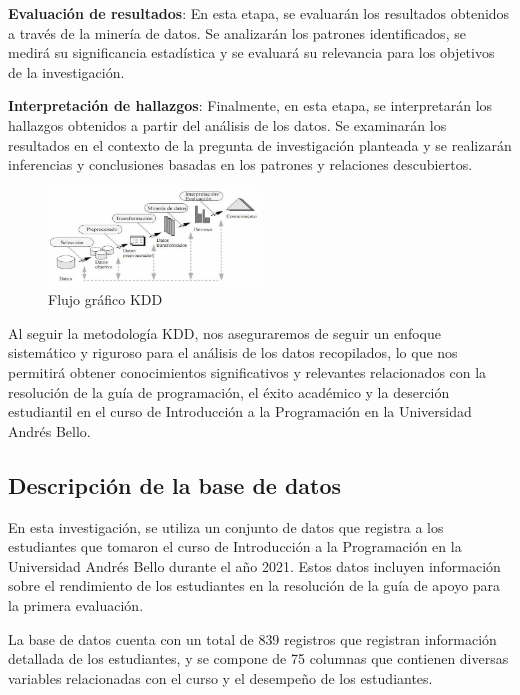 \textbf{Evaluación de resultados}: En esta etapa, se evaluarán los resultados obtenidos a través de la minería de datos. Se analizarán los patrones identificados, se medirá su significancia estadística y se evaluará su relevancia para los objetivos de la investigación.

\textbf{Interpretación de hallazgos}: Finalmente, en esta etapa, se interpretarán los hallazgos obtenidos a partir del análisis de los datos. Se examinarán los resultados en el contexto de la pregunta de investigación planteada y se realizarán inferencias y conclusiones basadas en los patrones y relaciones descubiertos.

\begin{figure}[H]
  \centering
  \includegraphics[width=0.5\textwidth]{img/KDD.png}
  \caption{Flujo gráfico KDD}
  \label{fig:flujo_kdd}
\end{figure}

Al seguir la metodología KDD, nos aseguraremos de seguir un enfoque sistemático y riguroso para el análisis de los datos recopilados, lo que nos permitirá obtener conocimientos significativos y relevantes relacionados con la resolución de la guía de programación, el éxito académico y la deserción estudiantil en el curso de Introducción a la Programación en la Universidad Andrés Bello.


\subsection{Descripción de la base de datos}

En esta investigación, se utiliza un conjunto de datos que registra a los estudiantes que tomaron el
curso de Introducción a la Programación en la Universidad Andrés Bello durante el año 2021.
Estos datos incluyen información sobre el rendimiento de los estudiantes en la resolución de la guía de apoyo para la primera evaluación.

La base de datos cuenta con un total de 839 registros que registran información detallada de los
estudiantes, y se compone de 75 columnas que contienen diversas variables relacionadas con el curso
y el desempeño de los estudiantes.

